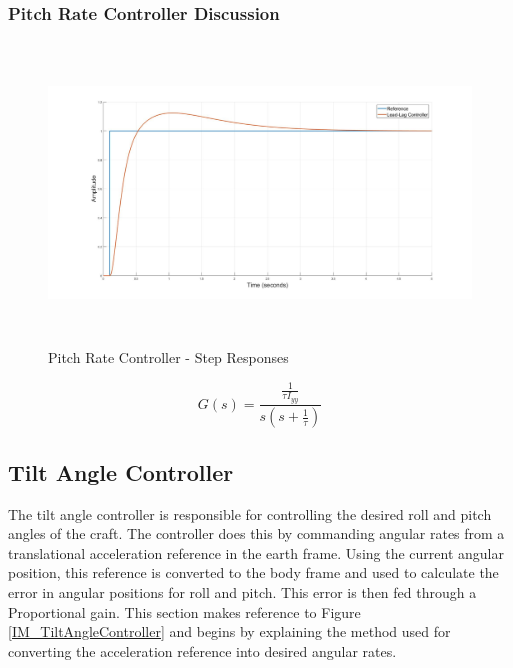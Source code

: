 \documentclass[12pt]{report}
\begin{document}
\subsubsection{Pitch Rate Controller Discussion}

\begin{figure}[H]
	\centering
	\includegraphics[height = 8cm]{../Design/Matlab/Controllers/pitch_rate_step.jpg}
	\caption{Pitch Rate Controller -  Step Responses}
	\label{IM_PitchRateStep}
\end{figure}



\begin{equation}
\label{EQ_PitchRateTF}
G(s) = \frac{\frac{1}{\tau I_{yy}}}{s (s + \frac{1}{\tau})}
\end{equation}


\subsection{Tilt Angle Controller}
The tilt angle controller is responsible for controlling the desired roll and pitch angles of the craft. The controller does this by commanding angular rates from a translational acceleration reference in the earth frame. Using the current angular position, this reference is converted to the body frame and used to calculate the error in angular positions for roll and pitch. This error is then fed through a Proportional gain. This section makes reference to Figure \ref{IM_TiltAngleController} and begins by explaining the method used for converting the acceleration reference into desired angular rates.
\end{document}
